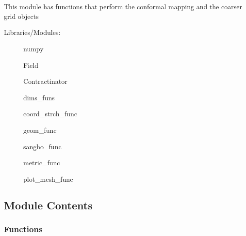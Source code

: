 \documentclass[letterpaper,10pt,english]{sphinxmanual}
\begin{document}
\section{}
\label{\detokenize{autoapi/airfoil_map/index:module-airfoil_map}}\label{\detokenize{autoapi/airfoil_map/index:airfoil-map}}\label{\detokenize{autoapi/airfoil_map/index::doc}}
\sphinxAtStartPar
This module has functions that perform the conformal mapping and the coarser grid objects
\begin{description}
\item[{Libraries/Modules:}] \leavevmode
\sphinxAtStartPar
numpy

\sphinxAtStartPar
Field

\sphinxAtStartPar
Contractinator

\sphinxAtStartPar
dims\_funs

\sphinxAtStartPar
coord\_strch\_func

\sphinxAtStartPar
geom\_func

\sphinxAtStartPar
sangho\_func

\sphinxAtStartPar
metric\_func

\sphinxAtStartPar
plot\_mesh\_func

\end{description}


\subsection{Module Contents}
\label{\detokenize{autoapi/airfoil_map/index:module-contents}}

\subsubsection{Functions}
\label{\detokenize{autoapi/airfoil_map/index:functions}}
\end{document}

